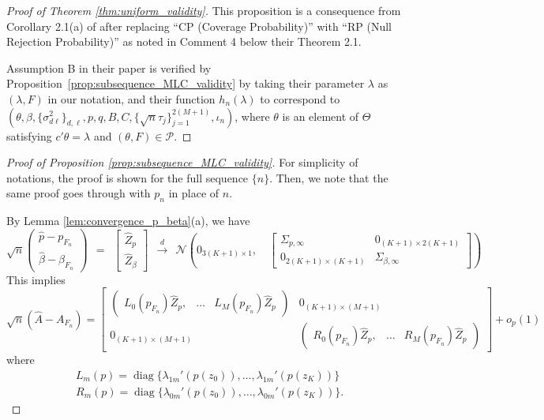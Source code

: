 \documentclass[11pt]{article}
\theoremstyle{definition}
\DeclareMathOperator*{\diag}{diag}
\newcommand{\0}{\ensuremath{\mathbf{0}}}
\newcommand{\normal}{\ensuremath{\mathcal{N}}}
\begin{document}
\begin{bibunit}
%

\bigskip

%
\begin{proof}[Proof of Theorem \ref{thm:uniform_validity}]
This proposition is a consequence from Corollary 2.1(a) of \citet{andrews/cheng/guggenberger:2020} after replacing “CP (Coverage Probability)” with “RP (Null Rejection Probability)” as noted in Comment 4 below their Theorem 2.1.

Assumption B in their paper is verified by Proposition~\ref{prop:subsequence_MLC_validity}
by taking their parameter $\lambda$ as $(\lambda, F)$ in our notation, 
and their function $h_n(\lambda)$ to correspond to $(\theta, \beta, \{\sigma^2_{d\ell}\}_{d,\ell}, p, q,B,C,\{\sqrt{n}\tau_j\}_{j=1}^{2(M+1)}, \iota_n)$, 
where $\theta$ is an element of $\Theta$ satisfying $c'\theta = \lambda$ and $(\theta, F) \in \mathcal{P}$.
\end{proof}

%
%
%
%
%
%
%
%
%
%
%
%
%
%
%
%
%
%
%
%
%
%
%
%
%
%
%

\bigskip


%
\begin{proof}[Proof of Proposition \ref{prop:subsequence_MLC_validity}]
For simplicity of notations, the proof is shown for the full sequence $\{n\}$. Then, we note that the same proof goes through with $p_n$ in place of $n$.


By Lemma \ref{lem:convergence_p_beta}(a), we have 
\[
	\sqrt{n}
	\begin{pmatrix}
		\hat{p} - p_{F_n} \\
		\hat{\beta} - \beta_{F_n}
	\end{pmatrix}
	~~=~~
	\begin{bmatrix}
		\hat{Z}_p \\
		\hat{Z}_\beta
	\end{bmatrix}
	~~\xrightarrow{d}~~
	\normal\left(0_{3(K+1)\times 1},  \quad 
	\begin{bmatrix}
		\Sigma_{p,\infty} & 0_{(K+1)\times 2(K+1)} \\
		0_{2(K+1)\times (K+1)} & \Sigma_{\beta,\infty}
	\end{bmatrix}\right)
\]
This implies
	\begin{equation}
	\label{eq:A_mat_asymptotics}
		\sqrt{n}(\hat{A} - A_{F_n}) 
		= \begin{bmatrix}
			\begin{pmatrix}
				L_0(p_{F_n})\hat{Z}_p, & \ldots & L_M(p_{F_n})\hat{Z}_p  
			\end{pmatrix}
			& 0_{(K+1)\times(M+1)} \\
			0_{(K+1)\times (M+1)} & 
			\begin{pmatrix}
				R_0(p_{F_n})\hat{Z}_p, & \ldots & R_M(p_{F_n})\hat{Z}_p  
			\end{pmatrix}
		\end{bmatrix}
		+o_p(1)
	\end{equation}
	where
	\begin{align*}
		& L_m(p) = \diag\{\lambda_{1m}'(p(z_0)), \ldots,\lambda_{1m}'(p(z_K))\} \\
		& R_m(p) = \diag\{\lambda_{0m}'(p(z_0)), \ldots, \lambda_{0m}'(p(z_K))\}.
	\end{align*}


\end{proof}
\end{bibunit}
\end{document}
